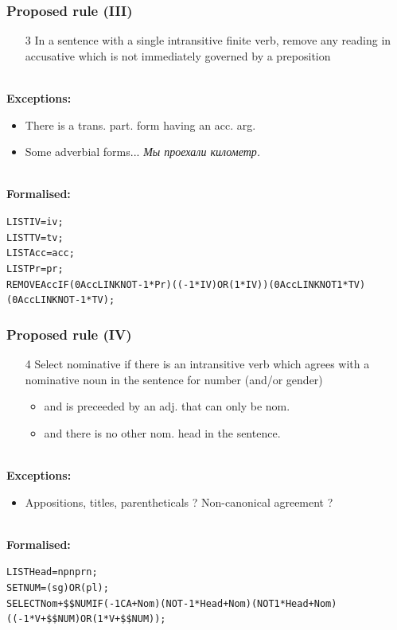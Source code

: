 \documentclass{beamer}
\begin{document}
\begin{frame}
  \frametitle{Proposed rule (III)}

  \begin{itemize}
    \item[3] In a sentence with a single intransitive finite verb, remove any reading in accusative which is not
       immediately governed by a preposition %
  \end{itemize}

~\\
\textbf{Exceptions:}
  \begin{itemize}
    \item There is a trans. part. form having an acc. arg.
    \item Some adverbial forms... \emph{Мы проехали километр.}
  \end{itemize}

~\\
\textbf{Formalised:}
{\small
  \begin{alltt}
  LIST IV = iv ; \\
  LIST TV = tv ; \\
  LIST Acc = acc ; \\
  LIST Pr = pr ; \\
  REMOVE Acc IF (0 Acc LINK NOT -1* Pr) ((-1* IV) OR (1* IV)) (0 Acc LINK NOT 1* TV) (0 Acc LINK NOT -1* TV) ; 
  \end{alltt}
}
\end{frame}
  
\begin{frame}
  \frametitle{Proposed rule (IV)}

  \begin{itemize}
    \item[4] Select nominative if there is an intransitive verb which agrees with a nominative noun in the sentence 
       for number (and/or gender)
     \begin{itemize}
        \item and is preceeded by an adj. that can only be nom.
        \item and there is no other nom. head in the sentence.
     \end{itemize}
  \end{itemize}
~\\
\textbf{Exceptions:}
  \begin{itemize}
    \item Appositions, titles, parentheticals ? Non-canonical agreement ?
  \end{itemize}
~\\
\textbf{Formalised:}
{\small
  \begin{alltt}
    LIST Head = np n prn ;\\
    SET NUM = (sg) OR (pl) ; \\
    SELECT Nom + \$\$NUM IF (-1C A + Nom) (NOT -1* Head + Nom) (NOT 1* Head + Nom) ((-1* V + \$\$NUM) OR (1* V + \$\$NUM));
  \end{alltt}
}
\end{frame}
\end{document}
